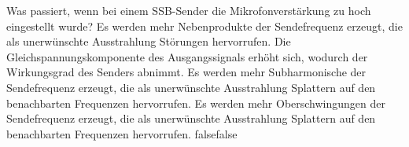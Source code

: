     {Was passiert, wenn bei einem SSB-Sender die Mikrofonverstärkung zu hoch eingestellt wurde?}
    {Es werden mehr Nebenprodukte der Sendefrequenz erzeugt, die als unerwünschte Ausstrahlung Störungen hervorrufen.}
    {Die Gleichspannungskomponente des Ausgangssignals erhöht sich, wodurch der Wirkungsgrad des Senders abnimmt.}
    {Es werden mehr Subharmonische der Sendefrequenz erzeugt, die als unerwünschte Ausstrahlung Splattern auf den benachbarten Frequenzen hervorrufen.}
    {Es werden mehr Oberschwingungen der Sendefrequenz erzeugt, die als unerwünschte Ausstrahlung Splattern auf den benachbarten Frequenzen hervorrufen.}
    {false}{false}